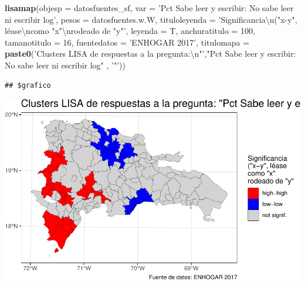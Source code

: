 \documentclass[11pt,]{article}
\newenvironment{Shaded}{\begin{snugshade}}{\end{snugshade}}
\newcommand{\KeywordTok}[1]{\textcolor[rgb]{0.13,0.29,0.53}{\textbf{#1}}}
\newcommand{\DataTypeTok}[1]{\textcolor[rgb]{0.13,0.29,0.53}{#1}}
\newcommand{\DecValTok}[1]{\textcolor[rgb]{0.00,0.00,0.81}{#1}}
\newcommand{\CharTok}[1]{\textcolor[rgb]{0.31,0.60,0.02}{#1}}
\newcommand{\StringTok}[1]{\textcolor[rgb]{0.31,0.60,0.02}{#1}}
\newcommand{\NormalTok}[1]{#1}
\begin{document}
\begin{Shaded}
\begin{Highlighting}[]
\KeywordTok{lisamap}\NormalTok{(}\DataTypeTok{objesp =}\NormalTok{ datosfuentes_sf,}
        \DataTypeTok{var =} \StringTok{'Pct Sabe leer y escribir: No sabe leer ni escribir log'}\NormalTok{,}
        \DataTypeTok{pesos =}\NormalTok{ datosfuentes.w.W,}
        \DataTypeTok{tituloleyenda =} \StringTok{'Significancia}\CharTok{\textbackslash{}n}\StringTok{("x-y", léase}\CharTok{\textbackslash{}n}\StringTok{como "x"}\CharTok{\textbackslash{}n}\StringTok{rodeado de "y"'}\NormalTok{,}
        \DataTypeTok{leyenda =}\NormalTok{ T,}
        \DataTypeTok{anchuratitulo =} \DecValTok{100}\NormalTok{,}
        \DataTypeTok{tamanotitulo =} \DecValTok{16}\NormalTok{,}
        \DataTypeTok{fuentedatos =} \StringTok{'ENHOGAR 2017'}\NormalTok{,}
        \DataTypeTok{titulomapa =} \KeywordTok{paste0}\NormalTok{(}\StringTok{'Clusters LISA de respuestas a la pregunta:}\CharTok{\textbackslash{}n}\StringTok{"'}\NormalTok{,}\StringTok{"Pct Sabe leer y escribir: No sabe leer ni escribir log"}\NormalTok{ , }\StringTok{'"'}\NormalTok{))}
\end{Highlighting}
\end{Shaded}

\begin{verbatim}
## $grafico
\end{verbatim}

\includegraphics{proyecto_files/figure-latex/unnamed-chunk-12-1.pdf}
\end{document}
